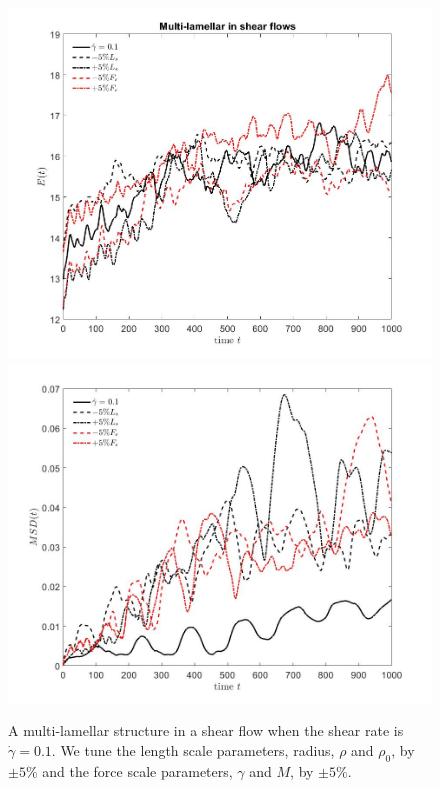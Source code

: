 \documentclass[aps,prl,preprint,groupedaddress]{revtex4-2}
\begin{document}
\begin{figure}
  \begin{center}
  \includegraphics[height=0.2\textheight]{multilamellar_shear0p1_Energy_LsFs}
    \includegraphics[height=0.2\textheight]{multilamellar_shear0p1_MSD_LsFs}
  \end{center}
    \caption{\label{fig:BC2_tests} A multi-lamellar structure in a shear flow when the shear rate is $\dot\gamma=0.1$. We tune the length scale parameters, radius, $\rho$ and $\rho_0$, by $\pm 5\%$ and the force scale parameters, $\gamma$ and $M$, by $\pm 5\%$.    }
\end{figure}
\end{document}
